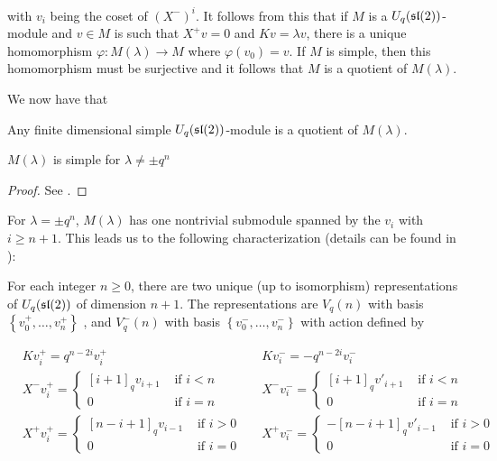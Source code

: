 with $v_i$ being the coset of $(X^-)^i$. It follows from this that if $M$ is a
$U_q(\mathfrak{sl}(2))$-module and $v \in M$ is such that $X^+ v = 0$ and $Kv = \lambda v$, there
is a unique homomorphism $\varphi: M(\lambda) \to M$ where $\varphi(v_0) = v$.
If $M$ is simple, then this homomorphism must be  surjective and it follows
that $M$ is a quotient of $M(\lambda)$. 

We now have that 
\begin{claim}
    Any finite dimensional simple $U_q(\mathfrak{sl}(2))$-module is a quotient of $M(\lambda)$.
\end{claim}

\begin{claim}
    $M(\lambda)$ is simple for $\lambda \neq \pm q^n$
\end{claim}

\begin{proof}
    See \cite{Jantzen1995}.
\end{proof}

For $\lambda = \pm q^{n}$, $M(\lambda)$ has one nontrivial submodule spanned by the $v_i$ with $i \geq n+1$.
This leads us to the following characterization (details can be found in \cite{Jantzen1995}):


For each integer $n \geq 0$, there are two unique (up to isomorphism)
representations of $U_q(\mathfrak{sl}(2))$ of dimension $n+1$. 
The representations are $V_q(n)$ with basis $\left\{ v^+_0, \ldots, v^+_n
\right\}$ , and $V_q^-(n)$ with basis $\left\{ v^-_0, \ldots, v^-_n \right\}$
with action defined by 

\begin{align*}
    &K v^+_i = q^{n-2i} v^+_i  &
    &K v^-_i = -q^{n-2i} v^-_i \\
    &X^- v^+_i = \begin{cases} [i+1]_qv_{i+1}& \text{ if $i < n$} \\ 0& \text{ if $i = n$} \end{cases} &
    &X^- v^-_i = \begin{cases} [i+1]_qv'_{i+1}& \text{ if $i < n$} \\ 0& \text{ if $i = n$} \end{cases} \\
    & X^+  v^+_i = \begin{cases} 
                     [n-i+1]_qv_{i-1}& \text{ if $i > 0$} \\ 
                    0& \text{ if $i = 0$} 
             \end{cases} &
    & X^+  v^-_i = \begin{cases} 
                    -[n-i+1]_q v'_{i-1}& \text{ if $i > 0$} \\ 
                    0& \text{ if $i = 0$} 
             \end{cases}
\end{align*}


